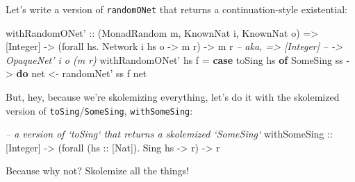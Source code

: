 \documentclass[]{article}
\newenvironment{Shaded}{\begin{snugshade}}{\end{snugshade}}
\newcommand{\CommentTok}[1]{\textcolor[rgb]{0.56,0.35,0.01}{\textit{#1}}}
\newcommand{\DataTypeTok}[1]{\textcolor[rgb]{0.13,0.29,0.53}{#1}}
\newcommand{\FunctionTok}[1]{\textcolor[rgb]{0.00,0.00,0.00}{#1}}
\newcommand{\KeywordTok}[1]{\textcolor[rgb]{0.13,0.29,0.53}{\textbf{#1}}}
\newcommand{\NormalTok}[1]{#1}
\newcommand{\OtherTok}[1]{\textcolor[rgb]{0.56,0.35,0.01}{#1}}
\begin{document}
Let's write a version of \texttt{randomONet} that returns a continuation-style
existential:

\begin{Shaded}
\begin{Highlighting}[]
\OtherTok{withRandomONet' ::}\NormalTok{ (}\DataTypeTok{MonadRandom}\NormalTok{ m, }\DataTypeTok{KnownNat}\NormalTok{ i, }\DataTypeTok{KnownNat}\NormalTok{ o)}
                \OtherTok{=>}\NormalTok{ [}\DataTypeTok{Integer}\NormalTok{]}
                \OtherTok{->}\NormalTok{ (forall hs}\FunctionTok{.} \DataTypeTok{Network}\NormalTok{ i hs o }\OtherTok{->}\NormalTok{ m r)}
                \OtherTok{->}\NormalTok{ m r}
\CommentTok{--         aka, => [Integer]}
\CommentTok{--              -> OpaqueNet' i o (m r)}
\NormalTok{withRandomONet' hs f }\FunctionTok{=} \KeywordTok{case}\NormalTok{ toSing hs }\KeywordTok{of}
                         \DataTypeTok{SomeSing}\NormalTok{ ss }\OtherTok{->} \KeywordTok{do}
\NormalTok{                           net }\OtherTok{<-}\NormalTok{ randomNet' ss}
\NormalTok{                           f net}
\end{Highlighting}
\end{Shaded}

But, hey, because we're skolemizing everything, let's do it with the skolemized
version of \texttt{toSing}/\texttt{SomeSing}, \texttt{withSomeSing}:

\begin{Shaded}
\begin{Highlighting}[]
\CommentTok{-- a version of `toSing` that returns a skolemized `SomeSing`}
\OtherTok{withSomeSing ::}\NormalTok{ [}\DataTypeTok{Integer}\NormalTok{]}
             \OtherTok{->}\NormalTok{ (forall (}\OtherTok{hs ::}\NormalTok{ [}\DataTypeTok{Nat}\NormalTok{])}\FunctionTok{.} \DataTypeTok{Sing}\NormalTok{ hs }\OtherTok{->}\NormalTok{ r)}
             \OtherTok{->}\NormalTok{ r}
\end{Highlighting}
\end{Shaded}

Because why not? Skolemize all the things!

\begin{Shaded}
\end{Shaded}
\end{document}
